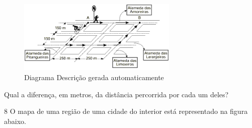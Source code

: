 \begin{escolha}
\begin{boxmedio}
\begin{boxmedio}
{\begin{boxpeq}
\begin{boxpeq}
{\begin{boxpeq}
\begin{boxmedio}
\begin{boxmedio}
\begin{boxpeq}
\begin{boxmedio}
\begin{boxpeq}
\begin{boxpeq}
\begin{boxpeq}
\begin{boxpeq}
\begin{boxmedio}
{\begin{boxmedio}
\begin{boxmedio}
\begin{boxpeq}
\begin{boxmedio}
\begin{boxpeq}
\begin{boxpeq}
\begin{boxpeq}
\begin{escolha}
{\begin{boxmedio}
\begin{boxpeq}
\begin{boxpeq}
\begin{boxpeq}
\begin{boxpeq}
\begin{boxpeq}
\begin{boxmedio}
\begin{boxpeq}
\begin{boxpeq}
\begin{boxpeq}
{\begin{boxpeq}
\begin{boxmedio}
\begin{boxpeq}
\begin{boxpeq}
\begin{boxpeq}
{\begin{boxpeq}
\begin{boxmedio}
{\begin{boxpeq}
\begin{boxpeq}
\begin{boxmedio}
\begin{boxmedio}
\begin{boxpeq}
\begin{boxpeq}
{\begin{boxpeq}
\begin{boxpeq}
\begin{boxpeq}
\begin{boxpeq}
\begin{boxpeq}
\begin{escolha}
\begin{escolha}
{\begin{boxmedio}
\begin{boxpeq}
\begin{q°}
\begin{boxmedio}
\begin{boxpeq}
\begin{boxpeq}
\begin{boxmedio}
\begin{boxmedio}
\begin{boxmedio}
\begin{figure}
\centering
\includegraphics[width=3.00694in,height=1.36847in]{./_SAEB_9_MAT/media/image206.png}
\caption{Diagrama Descrição gerada automaticamente}
\end{figure}

Qual a diferença, em metros, da distância percorrida por cada um deles?


\num{8} O mapa de uma região de uma cidade do interior está representado na
figura abaixo.


\end{boxmedio}
\end{boxmedio}
\end{boxmedio}
\end{boxpeq}
\end{boxpeq}
\end{boxmedio}
\end{q°}
\end{boxpeq}
\end{boxmedio}}
\end{escolha}
\end{escolha}
\end{boxpeq}
\end{boxpeq}
\end{boxpeq}
\end{boxpeq}
\end{boxpeq}}
\end{boxpeq}
\end{boxpeq}
\end{boxmedio}
\end{boxmedio}
\end{boxpeq}
\end{boxpeq}}
\end{boxmedio}
\end{boxpeq}}
\end{boxpeq}
\end{boxpeq}
\end{boxpeq}
\end{boxmedio}
\end{boxpeq}}
\end{boxpeq}
\end{boxpeq}
\end{boxpeq}
\end{boxmedio}
\end{boxpeq}
\end{boxpeq}
\end{boxpeq}
\end{boxpeq}
\end{boxpeq}
\end{boxmedio}}
\end{escolha}
\end{boxpeq}
\end{boxpeq}
\end{boxpeq}
\end{boxmedio}
\end{boxpeq}
\end{boxmedio}
\end{boxmedio}}
\end{boxmedio}
\end{boxpeq}
\end{boxpeq}
\end{boxpeq}
\end{boxpeq}
\end{boxmedio}
\end{boxpeq}
\end{boxmedio}
\end{boxmedio}
\end{boxpeq}}
\end{boxpeq}
\end{boxpeq}}
\end{boxmedio}
\end{boxmedio}
\end{escolha}
